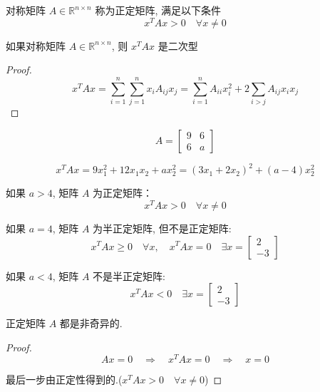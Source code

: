 \begin{definition}[正定矩阵]
    对称矩阵 $ A \in \mathbb{R}^{n \times n} $ 称为正定矩阵, 满足以下条件
$$
x^{T} A x>0 \quad \forall x \neq 0
$$
\end{definition}

\begin{definition}[二次型]
    如果对称矩阵 $ A \in \mathbb{R}^{n \times n} $, 则 $ x^{T} A x $ 是二次型
\end{definition}

\begin{proof}
    $$ x^{T} A x=\sum_{i=1}^{n} \sum_{j=1}^{n} x_{i} A_{i j} x_{j}=\sum_{i=1}^{n} A_{i i} x_{i}^{2}+2 \sum_{i>j} A_{i j} x_{i} x_{j} $$
\end{proof}

\begin{example}
    $$ A=\left[\begin{array}{ll}9 & 6 \\ 6 & a\end{array}\right] $$

    $$ x^{T} A x=9 x_{1}^{2}+12 x_{1} x_{2}+a x_{2}^{2}=\left(3 x_{1}+2 x_{2}\right)^{2}+(a-4) x_{2}^{2} $$

    如果 $ a>4 $, 矩阵 $ A $ 为正定矩阵：
$$
x^{T} A x>0 \quad \forall x \neq 0
$$

如果 $ a=4 $, 矩阵 $ A $ 为半正定矩阵, 但不是正定矩阵:
$$
x^{T} A x \geq 0 \quad \forall x, \quad x^{T} A x=0 \quad \exists x=\left[\begin{array}{l}
2 \\
-3
\end{array}\right]
$$

如果 $ a<4 $, 矩阵 $ A $ 不是半正定矩阵:
$$
x^{T} A x<0 \quad \exists x=\left[\begin{array}{l}
2 \\
-3
\end{array}\right]
$$
\end{example}

\begin{corollary}
    正定矩阵 $ A $ 都是非奇异的.
\end{corollary}

\begin{proof}
    $$ A x=0 \quad \Rightarrow \quad x^{T} A x=0 \quad \Rightarrow \quad x=0 $$

    最后一步由正定性得到的.($
    x^{T} A x>0 \quad \forall x \neq 0
    $)

\end{proof}

